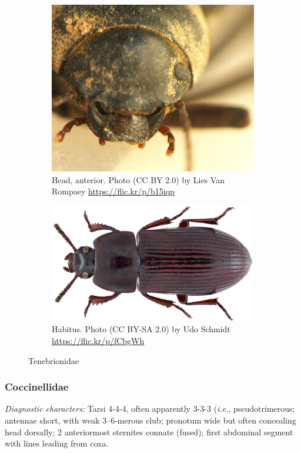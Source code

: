 \documentclass[letterpaper, 11pt]{article}
\begin{document}
\begin{figure}[ht!]
  \centering
\begin{subfigure}[ht!]{0.38\textwidth}
    \includegraphics[width=\textwidth]{TenebrionidHead}
  \caption{Head, anterior. Photo (CC BY 2.0) by Lies Van Rompaey \url{https://flic.kr/p/b15iqp}}
  \label{fig:tenebrionid1}
\end{subfigure}
    \qquad
\begin{subfigure}[ht!]{0.5\textwidth}
    \includegraphics[width=\textwidth]{TenebrionidHabitus}
  \caption{Habitus. Photo (CC BY-SA 2.0) by Udo Schmidt \url{https://flic.kr/p/fCbgWh}}
  \label{fig:tenebrionid2}
\end{subfigure}
    \caption{Tenebrionidae}\label{fig:tenebrionids}
\end{figure}

\subsubsection{Coccinellidae}
\noindent{}\textit{Diagnostic characters:} Tarsi 4-4-4, often apparently 3-3-3 (\textit{i.e.}, pseudotrimerous; antennae short, with weak 3--6-merous club; pronotum wide but often concealing head dorsally; 2 anteriormost sternites connate (fused); first abdominal segment with lines leading from coxa.\\
\end{document}
